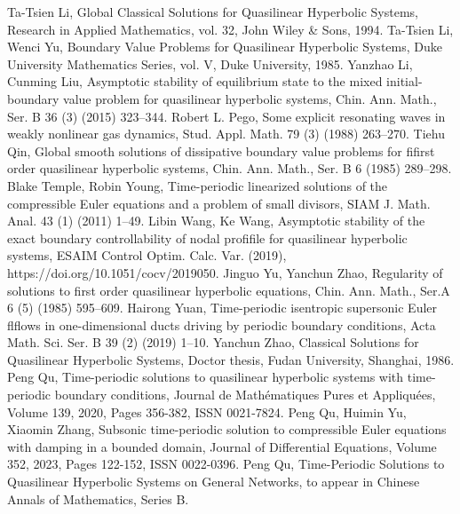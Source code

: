 \documentclass[notitlepage,cs4size,punct,oneside]{ctexrep}
\numberwithin{equation}{chapter}
\theoremstyle{mystyle}
\begin{document}
\begin{thebibliography}{99}
     Ta-Tsien Li, Global Classical Solutions for Quasilinear Hyperbolic Systems, Research in Applied Mathematics, vol. 32, John Wiley \& Sons, 1994.
     Ta-Tsien Li, Wenci Yu, Boundary Value Problems for Quasilinear Hyperbolic Systems, Duke University Mathematics Series, vol. V, Duke University, 1985.
     Yanzhao Li, Cunming Liu, Asymptotic stability of equilibrium state to the mixed initial-boundary value problem for quasilinear hyperbolic systems, Chin. Ann. Math., Ser. B 36 (3) (2015) 323--344.
      Robert L. Pego, Some explicit resonating waves in weakly nonlinear gas dynamics, Stud. Appl. Math. 79 (3) (1988) 263--270.
     Tiehu Qin, Global smooth solutions of dissipative boundary value problems for fifirst order quasilinear hyperbolic systems, Chin. Ann. Math., Ser. B 6 (1985) 289--298.
     Blake Temple, Robin Young, Time-periodic linearized solutions of the compressible Euler equations and a problem of small divisors, SIAM J. Math. Anal. 43 (1) (2011) 1--49.
     Libin Wang, Ke Wang, Asymptotic stability of the exact boundary controllability of nodal profifile for quasilinear hyperbolic systems, ESAIM Control Optim. Calc. Var. (2019), https://doi.org/10.1051/cocv/2019050.
     Jinguo Yu, Yanchun Zhao, Regularity of solutions to first order quasilinear hyperbolic equations, Chin. Ann. Math., Ser.A 6 (5) (1985) 595--609.
     Hairong Yuan, Time-periodic isentropic supersonic Euler flflows in one-dimensional ducts driving by periodic boundary conditions, Acta Math. Sci. Ser. B 39 (2) (2019) 1--10.
     Yanchun Zhao, Classical Solutions for Quasilinear Hyperbolic Systems, Doctor thesis, Fudan University, Shanghai, 1986.
     Peng Qu, Time-periodic solutions to quasilinear hyperbolic systems with time-periodic boundary conditions, Journal de Mathématiques Pures et Appliquées, Volume 139, 2020, Pages 356-382, ISSN 0021-7824.
     Peng Qu, Huimin Yu, Xiaomin Zhang, Subsonic time-periodic solution to compressible Euler equations with damping in a bounded domain, Journal of Differential Equations, Volume 352, 2023, Pages 122-152, ISSN 0022-0396.
     Peng Qu, Time-Periodic Solutions to Quasilinear Hyperbolic Systems on General Networks, to appear in Chinese Annals of Mathematics, Series B.
\end{thebibliography}



%
%
\end{document}
